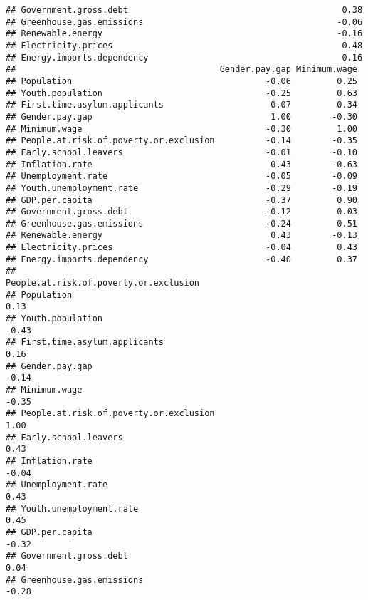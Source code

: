\documentclass[
]{article}
\begin{document}
\begin{verbatim}
## Government.gross.debt                                          0.38
## Greenhouse.gas.emissions                                      -0.06
## Renewable.energy                                              -0.16
## Electricity.prices                                             0.48
## Energy.imports.dependency                                      0.16
##                                        Gender.pay.gap Minimum.wage
## Population                                      -0.06         0.25
## Youth.population                                -0.25         0.63
## First.time.asylum.applicants                     0.07         0.34
## Gender.pay.gap                                   1.00        -0.30
## Minimum.wage                                    -0.30         1.00
## People.at.risk.of.poverty.or.exclusion          -0.14        -0.35
## Early.school.leavers                            -0.01        -0.10
## Inflation.rate                                   0.43        -0.63
## Unemployment.rate                               -0.05        -0.09
## Youth.unemployment.rate                         -0.29        -0.19
## GDP.per.capita                                  -0.37         0.90
## Government.gross.debt                           -0.12         0.03
## Greenhouse.gas.emissions                        -0.24         0.51
## Renewable.energy                                 0.43        -0.13
## Electricity.prices                              -0.04         0.43
## Energy.imports.dependency                       -0.40         0.37
##                                        People.at.risk.of.poverty.or.exclusion
## Population                                                               0.13
## Youth.population                                                        -0.43
## First.time.asylum.applicants                                             0.16
## Gender.pay.gap                                                          -0.14
## Minimum.wage                                                            -0.35
## People.at.risk.of.poverty.or.exclusion                                   1.00
## Early.school.leavers                                                     0.43
## Inflation.rate                                                          -0.04
## Unemployment.rate                                                        0.43
## Youth.unemployment.rate                                                  0.45
## GDP.per.capita                                                          -0.32
## Government.gross.debt                                                    0.04
## Greenhouse.gas.emissions                                                -0.28

\end{verbatim}
\end{document}
